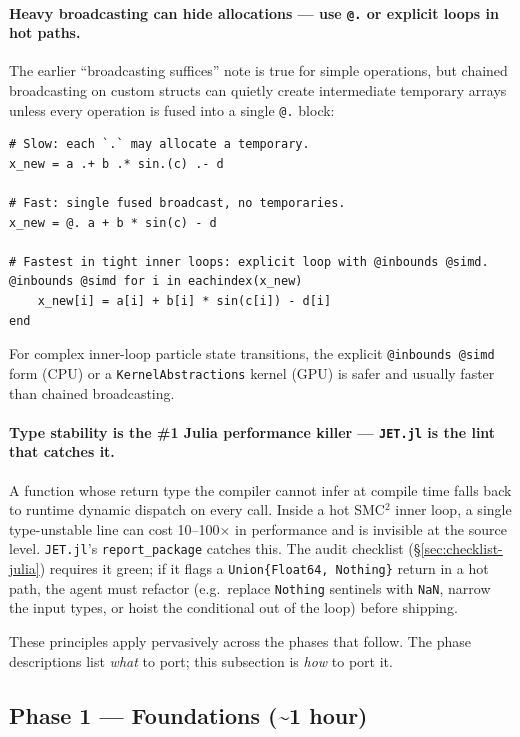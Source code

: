 \documentclass[11pt,a4paper]{article}
\begin{document}
\paragraph{Heavy broadcasting can hide allocations --- use
\texttt{@.} or explicit loops in hot paths.} The earlier
``broadcasting suffices'' note is true for simple operations, but
chained broadcasting on custom structs can quietly create
intermediate temporary arrays unless every operation is fused into a
single \texttt{@.} block:
\begin{lstlisting}
# Slow: each `.` may allocate a temporary.
x_new = a .+ b .* sin.(c) .- d

# Fast: single fused broadcast, no temporaries.
x_new = @. a + b * sin(c) - d

# Fastest in tight inner loops: explicit loop with @inbounds @simd.
@inbounds @simd for i in eachindex(x_new)
    x_new[i] = a[i] + b[i] * sin(c[i]) - d[i]
end
\end{lstlisting}
For complex inner-loop particle state transitions, the explicit
\texttt{@inbounds @simd} form (CPU) or a \texttt{KernelAbstractions}
kernel (GPU) is safer and usually faster than chained broadcasting.

\paragraph{Type stability is the \#1 Julia performance killer ---
\texttt{JET.jl} is the lint that catches it.} A function whose
return type the compiler cannot infer at compile time falls back to
runtime dynamic dispatch on every call. Inside a hot SMC$^2$ inner
loop, a single type-unstable line can cost 10--100$\times$ in
performance and is invisible at the source level. \texttt{JET.jl}'s
\texttt{report\_package} catches this. The audit checklist
(§\ref{sec:checklist-julia}) requires it green; if it flags a
\texttt{Union\{Float64, Nothing\}} return in a hot path, the agent
must refactor (e.g.\ replace \texttt{Nothing} sentinels with
\texttt{NaN}, narrow the input types, or hoist the conditional out
of the loop) before shipping.

These principles apply pervasively across the phases that follow.
The phase descriptions list \emph{what} to port; this subsection
is \emph{how} to port it.

\subsection{Phase 1 --- Foundations (\textasciitilde 1 hour)}
\end{document}
